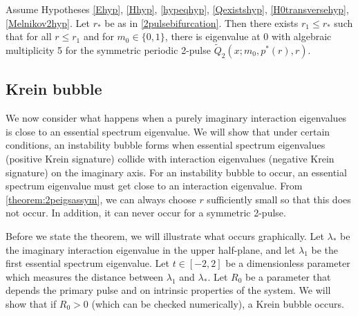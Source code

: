 \documentclass[thesis.tex]{subfiles}
\begin{document}
\begin{theorem}\label{theorem:2peigssym}
Assume Hypotheses \ref{Ehyp}, \ref{Hhyp}, \ref{hypeqhyp}, \ref{Qexistshyp}, \ref{H0transversehyp}, \ref{Melnikov2hyp}. Let $r_*$ be as in \cref{2pulsebifurcation}. Then there exists $r_1 \leq r_*$ such that for all $r \leq r_1$ and for $m_0 \in \{0, 1\}$, there is eigenvalue at 0 with algebraic multiplicity 5 for the symmetric periodic 2-pulse $\tilde{Q}_2(x; m_0, p^*(r), r)$.
\end{theorem}

\subsection{Krein bubble}

We now consider what happens when a purely imaginary interaction eigenvalues is close to an essential spectrum eigenvalue. We will show that under certain conditions, an instability bubble forms when essential spectrum eigenvalues (positive Krein signature) collide with interaction eigenvalues (negative Krein signature) on the imaginary axis. For an instability bubble to occur, an essential spectrum eigenvalue must get close to an interaction eigenvalue. From \cref{theorem:2peigsassym}, we can always choose $r$ sufficiently small so that this does not occur. In addition, it can never occur for a symmetric 2-pulse. 

Before we state the theorem, we will illustrate what occurs graphically. Let $\lambda_*$ be the imaginary interaction eigenvalue in the upper half-plane, and let $\lambda_1$ be the first essential spectrum eigenvalue. Let $t \in [-2, 2]$ be a dimensionless parameter which measures the distance between $\lambda_1$ and $\lambda_*$. Let $R_0$ be a parameter that depends the primary pulse and on intrinsic properties of the system. We will show that if $R_0 > 0$ (which can be checked numerically), a Krein bubble occurs.
\end{document}
